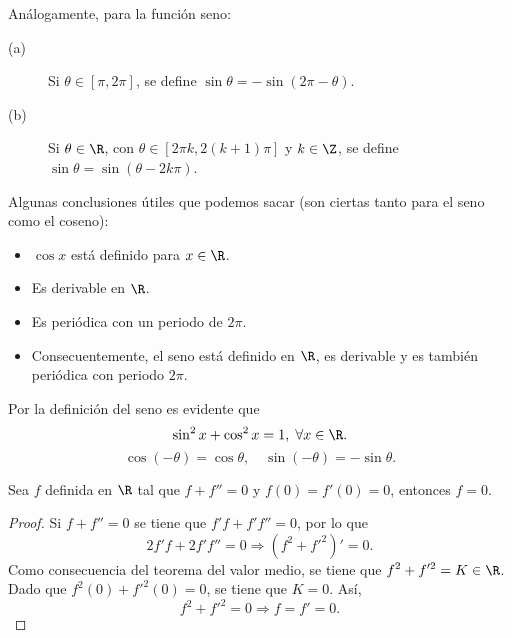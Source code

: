 \begin{fdefinition}[]
\normalfont Análogamente, para la función seno:
\begin{description}
	\item[(a)] Si $\displaystyle \theta \in [\pi, 2\pi ] $, se define $\displaystyle \sin\theta = -\sin\left(2\pi-\theta\right) $.
	\item[(b)] Si $\displaystyle \theta \in \R $, con $\displaystyle \theta \in [2\pi k, 2\left(k+1\right)\pi ] $ y $\displaystyle k \in \Z $, se define $\displaystyle \sin \theta = \sin\left(\theta - 2k\pi \right) $.
\end{description}
\end{fdefinition}
\begin{observation}
\normalfont Algunas conclusiones útiles que podemos sacar (son ciertas tanto para el seno como el coseno):
\begin{itemize}
\item $\displaystyle \cos x $ está definido para $\displaystyle x \in \R $.
\item Es derivable en $\displaystyle \R $.
\item Es periódica con un periodo de $\displaystyle 2\pi  $.
\item Consecuentemente, el seno está definido en $\displaystyle \R $, es derivable y es también periódica con periodo $\displaystyle 2\pi  $.
\end{itemize}
\end{observation}
\begin{observation}
\normalfont Por la definición del seno es evidente que
\[ \sin ^{2} x + \cos^{2}x = 1, \; \forall x \in \R.\]
\[\cos\left(-\theta \right)= \cos\theta, \quad \sin\left(-\theta\right) = -\sin\theta .\]
\end{observation}
\begin{flema}[]
\normalfont Sea $\displaystyle f $ definida en $\displaystyle \R $ tal que $\displaystyle f + f'' = 0 $ y $\displaystyle f\left(0\right) = f'\left(0\right) = 0 $, entonces $\displaystyle f = 0 $.
\end{flema}
\begin{proof}
Si $\displaystyle f + f'' = 0 $ se tiene que $\displaystyle f'f + f'f'' = 0 $, por lo que
\[2f'f + 2f'f'' = 0 \Rightarrow \left(f^{2} + f'^{2}\right)' = 0 .\]
Como consecuencia del teorema del valor medio, se tiene que $\displaystyle f^{2} + f'^{2} = K \in \R $. Dado que $\displaystyle f^{2}\left(0\right) + f'^{2}\left(0\right) = 0 $, se tiene que $\displaystyle K = 0 $. Así,
\[f^{2} + f'^{2} = 0 \Rightarrow f = f' = 0 .\]
\end{proof}
